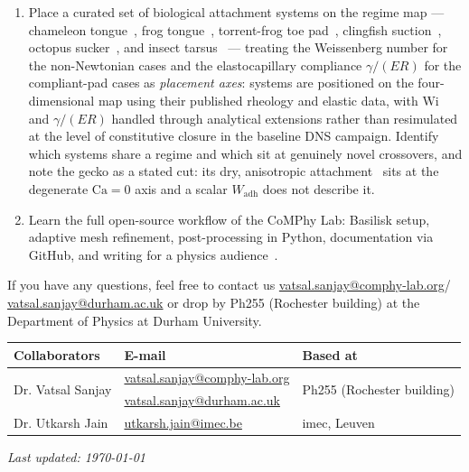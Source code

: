 \documentclass[11pt]{article}
\begin{document}
\begin{enumerate}
\item Place a curated set of biological attachment systems on the regime map --- chameleon tongue~\citep{brauChameleonTongue2016}, frog tongue~\citep{noelHuFrogTongue2017}, torrent-frog toe pad~\citep{barnesTreeFrogToePads2007,drotlefRockFrogToePad2015}, clingfish suction~\citep{wainwrightClingfishSuction2013}, octopus sucker~\citep{smithOctopusSucker1991}, and insect tarsus~\citep{dirksFederleInsectAdhesion2011,federleAdhesivePadsHairy2006} --- treating the Weissenberg number for the non-Newtonian cases and the elastocapillary compliance $\gamma/(ER)$ for the compliant-pad cases as \emph{placement axes}: systems are positioned on the four-dimensional map using their published rheology and elastic data, with $\mathrm{Wi}$ and $\gamma/(ER)$ handled through analytical extensions rather than resimulated at the level of constitutive closure in the baseline DNS campaign. Identify which systems share a regime and which sit at genuinely novel crossovers, and note the gecko as a stated cut: its dry, anisotropic attachment~\citep{autumnGeckoSeta2000} sits at the degenerate $\mathrm{Ca} = 0$ axis and a scalar $W_{\mathrm{adh}}$ does not describe it.
\item Learn the full open-source workflow of the CoMPhy Lab: Basilisk setup, adaptive mesh refinement, post-processing in Python, documentation via GitHub, and writing for a physics audience~\citep{basiliskVatsalDropFilm,basiliskVatsalViscousBouncing}.
\end{enumerate}

If you have any questions, feel free to contact us \href{mailto:vatsal.sanjay@comphy-lab.org}{vatsal.sanjay@comphy-lab.org}/\\\href{mailto:vatsal.sanjay@durham.ac.uk}{vatsal.sanjay@durham.ac.uk} or drop by Ph255 (Rochester building) at the Department of Physics at Durham University.

\begin{center}
\begin{tabular}{|l|l|l|}
\hline \textbf{Collaborators} & \textbf{E-mail} & \textbf{Based at} \\
\hline \multirow{2}{*}{Dr. Vatsal Sanjay} & \href{mailto:vatsal.sanjay@comphy-lab.org}{vatsal.sanjay@comphy-lab.org} & \multirow{2}{*}{Ph255 (Rochester building)} \\
& \href{mailto:vatsal.sanjay@durham.ac.uk}{vatsal.sanjay@durham.ac.uk} & \\
\hline Dr. Utkarsh Jain & \href{mailto:utkarsh.jain@imec.be}{utkarsh.jain@imec.be} & imec, Leuven \\
\hline
\end{tabular}
\end{center}

\vspace{1em}
\noindent\textit{Last updated: \today}

\printbibliography
\end{document}
